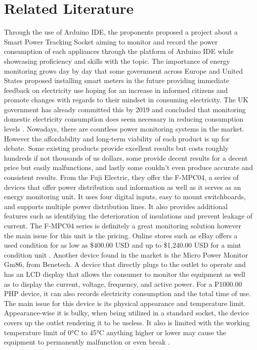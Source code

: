 \documentclass[conference, a4paper]{IEEEtran}
\begin{document}
\section{Related Literature}
Through the use of Arduino IDE, the proponents proposed a project about a Smart Power Tracking Socket aiming to monitor and record the power consumption of each appliances through the platform of Arduino IDE while showcasing proficiency and skills with the topic.
The importance of energy monitoring grows day by day that some government across Europe and United States proposed installing smart meters in the future providing immediate feedback on electricity use hoping for an increase in informed citizens and promote changes with regards to their mindset in consuming electricity. The UK government has already committed this by 2019 and concluded that monitoring domestic electricity consumption does seem necessary in reducing consumption levels \cite{webb_antecedents_2014}.
Nowadays, there are countless power monitoring systems in the market. However the affordability and long-term viability of each product is up for debate. Some existing products provide excellent results but costs roughly hundreds if not thousands of us dollars, some provide decent results for a decent price but easily malfunctions, and lastly some couldn’t even produce accurate and consistent results.
From the Fuji Electric, they offer the F-MPC04, a series of devices that offer power distribution and information as well as it serves as an energy monitoring unit. 
It uses four digital inputs, easy to mount switchboards, and supports multiple power distribution lines. It also provides additional features such as identifying the deterioration of insulations and prevent leakage of current. The F-MPC04 series is definitely a great monitoring solution however the main issue for this unit is the pricing. Online stores such as eBay offers a used condition for as low as \$400.00 USD and up to \$1,240.00 USD for a mint condition unit \cite{fuji_electric_fa_components__systems_co_ltd_f-mpc04_nodate}.
Another device found in the market is the Micro Power Monitor Gm86, from Benetech. A device that directly plugs to the outlet to operate and has an LCD display that allows the consumer to monitor the equipment as well as to display the current, voltage, frequency, and active power. For a ₱1000.00 PHP device, it can also records electricity consumption and the total time of use. The main issue for this device is its physical appearance and temperature limit. Appearance-wise it is bulky, when being utilized in a standard socket, the device covers up the outlet rendering it to be useless. It also is limited with the working temperature limit of 0°C to 45°C anything higher or lower may cause the equipment to permanently malfunction or even break \cite{shenzhen_wintact_electronics_co_ltd_micro_nodate}.
\end{document}
